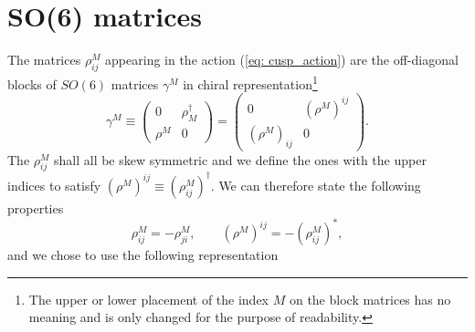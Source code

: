 \chapter{SO(6) matrices} \label{sec: SO6}
The matrices $\rho^{M}_{ij}$ appearing in the action (\ref{eq: cusp_action}) are the off-diagonal blocks of $SO(6)$  matrices $\gamma^{M}$ in chiral representation\footnote{The upper or lower placement of the index $M$ on the block matrices has no meaning and is only changed for the purpose of readability.}
%
%
\begin{equation}
\gamma^{M} \equiv \begin{pmatrix}
0 & \rho_{M}^{\dagger} \\
\rho^{M} & 0
\end{pmatrix}
= \begin{pmatrix}
0 & (\rho^{M})^{ij} \\
(\rho^{M})_{ij} & 0
\end{pmatrix} .
\end{equation}
%
%
The $\rho^{M}_{ij}$ shall all be skew symmetric and we define the ones with the upper indices to satisfy $(\rho^{M})^{ij}\equiv (\rho^{M}_{ij})^{\dagger}$. We can therefore state the following properties
%
%
\begin{equation}
\rho^{M}_{ij}= - \rho^{M}_{ji}, \qquad  (\rho^{M})^{ij} = - (\rho ^{M}_{ij})^{*},
\end{equation}
%
%
and we chose to use the following representation
%
%
